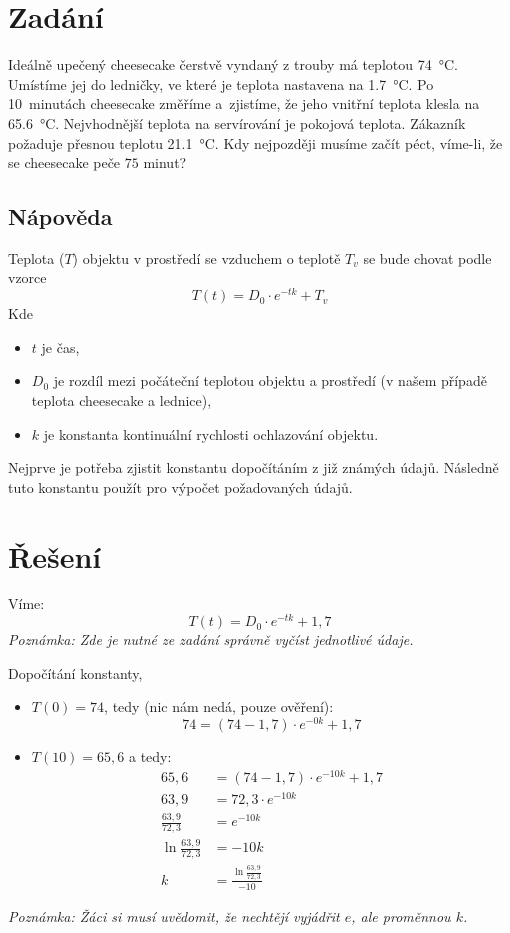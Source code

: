 \documentclass[12pt,a4paper,addpoints]{article}
\begin{document}
    \newpage

    \section{Zadání}
    Ideálně upečený cheesecake čerstvě vyndaný z trouby má teplotou \SI{74}{\celsius}. Umístíme jej do ledničky, ve které je teplota 
    nastavena na \SI{1,7}{\celsius}. Po 10~minutách cheesecake změříme a~zjistíme, že jeho vnitřní teplota klesla na \SI{65,6}{\celsius}.
    Nejvhodnější teplota na servírování je pokojová teplota. Zákazník požaduje přesnou teplotu  \SI{21,1}{\celsius}. Kdy nejpozději 
    musíme začít péct, víme-li, že se cheesecake peče $75$ minut?
   
    \subsection{Nápověda}
    Teplota ($T$) objektu v prostředí se vzduchem o teplotě $T_v$ se bude chovat podle vzorce
    $$T(t) = D_0 \cdot \textit{e}^{-tk} + T_v$$
    Kde 
    \begin{itemize}
        \item $t$ je čas,
        \item $D_0$ je rozdíl mezi počáteční teplotou objektu a prostředí (v našem případě teplota cheesecake a lednice),
        \item $k$ je konstanta kontinuální rychlosti ochlazování objektu.
    \end{itemize}

    Nejprve je potřeba zjistit konstantu dopočítáním z již známých údajů. Následně tuto konstantu použít pro výpočet požadovaných údajů. 

    \newpage
    \section{Řešení}
    Víme:
    $$T(t) = D_0 \cdot \textit{e}^{-tk} + 1,7$$
    \textit{Poznámka: Zde je nutné ze zadání správně vyčíst jednotlivé údaje.}
    
    Dopočítání konstanty, \begin{itemize}
        \item $T(0) = 74$, tedy (nic nám nedá, pouze ověření):
        $$74 = (74 - 1,7)\cdot \textit{e}^{-0k} + 1,7$$ 
        \item $T(10) = 65,6$ a tedy:
        \begin{align*}
            65,6 &= (74 - 1,7)\cdot \textit{e}^{-10k} + 1,7\\
            63,9 &= 72,3 \cdot \textit{e}^{-10k}\\
            \frac{63,9}{72,3} &= \textit{e}^{-10k}\\
            \ln{\frac{63,9}{72,3}} &= -10k\\
            k &= \frac{\ln{\frac{63,9}{72,3}}}{-10}
        \end{align*}
    \end{itemize}
    \textit{Poznámka: Žáci si musí uvědomit, že nechtějí vyjádřit $e$, ale proměnnou $k$.}
\end{document}
